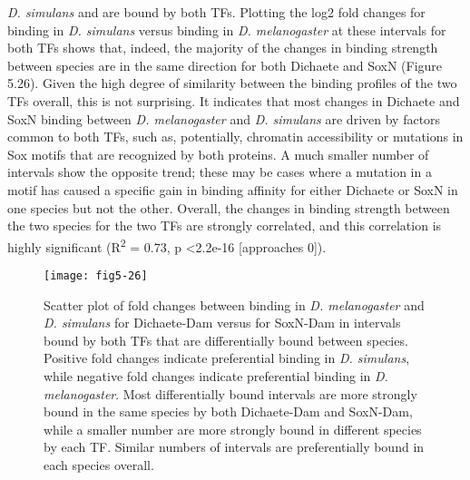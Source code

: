 \emph{D. simulans} and are bound by both TFs. Plotting the log2 fold changes for binding in \emph{D. simulans} versus binding in \emph{D. melanogaster} at these intervals for both TFs shows that, indeed, the majority of the changes in binding strength between species are in the same direction for both Dichaete and SoxN (Figure 5.26). Given the high degree of similarity between the binding profiles of the two TFs overall, this is not surprising. It indicates that most changes in Dichaete and SoxN binding between \emph{D. melanogaster} and \emph{D. simulans} are driven by factors common to both TFs, such as, potentially, chromatin accessibility or mutations in Sox motifs that are recognized by both proteins. A much smaller number of intervals show the opposite trend; these may be cases where a mutation in a motif has caused a specific gain in binding affinity for either Dichaete or SoxN in one species but not the other. Overall, the changes in binding strength between the two species for the two TFs are strongly correlated, and this correlation is highly significant (R\textsuperscript{2} = 0.73, p \textless 2.2e-16 [approaches 0]).

\begin{figure}[H]
\centering
\texttt{[image: fig5-26]}
\caption[Fold changes between binding in \emph{D. melanogaster} and \emph{D. simulans} for Dichaete-Dam versus for SoxN-Dam in intervals bound by both TFs that are differentially bound between species]{Scatter plot of fold changes between binding in \emph{D. melanogaster} and \emph{D. simulans} for Dichaete-Dam versus for SoxN-Dam in intervals bound by both TFs that are differentially bound between species. Positive fold changes indicate preferential binding in \emph{D. simulans}, while negative fold changes indicate preferential binding in \emph{D. melanogaster}. Most differentially bound intervals are more strongly bound in the same species by both Dichaete-Dam and SoxN-Dam, while a smaller number are more strongly bound in different species by each TF. Similar numbers of intervals are preferentially bound in each species overall.}
\label{Figure 5.26}
\end{figure}

